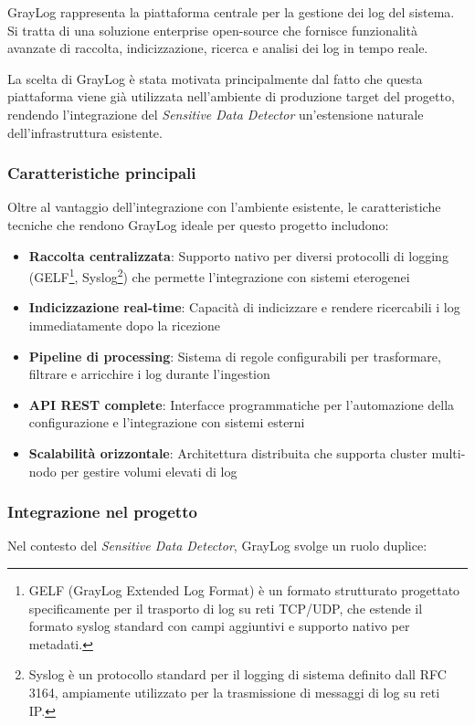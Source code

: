 \documentclass[12pt]{report}
\begin{document}
GrayLog rappresenta la piattaforma centrale per la gestione dei log del sistema. Si tratta di una soluzione enterprise open-source che fornisce funzionalità avanzate di raccolta, indicizzazione, ricerca e analisi dei log in tempo reale.

La scelta di GrayLog è stata motivata principalmente dal fatto che questa piattaforma viene già utilizzata nell'ambiente di produzione target del progetto, rendendo l'integrazione del \textit{Sensitive Data Detector} un'estensione naturale dell'infrastruttura esistente.

\subsubsection{Caratteristiche principali}
Oltre al vantaggio dell'integrazione con l'ambiente esistente, le caratteristiche tecniche che rendono GrayLog ideale per questo progetto includono:

\begin{itemize}
    \item \textbf{Raccolta centralizzata}: Supporto nativo per diversi protocolli di logging (GELF\footnote{GELF (GrayLog Extended Log Format) è un formato strutturato progettato specificamente per il trasporto di log su reti TCP/UDP, che estende il formato syslog standard con campi aggiuntivi e supporto nativo per metadati.}, Syslog\footnote{Syslog è un protocollo standard per il logging di sistema definito dall RFC 3164, ampiamente utilizzato per la trasmissione di messaggi di log su reti IP.}) che permette l'integrazione con sistemi eterogenei
    \item \textbf{Indicizzazione real-time}: Capacità di indicizzare e rendere ricercabili i log immediatamente dopo la ricezione
    \item \textbf{Pipeline di processing}: Sistema di regole configurabili per trasformare, filtrare e arricchire i log durante l'ingestion
    \item \textbf{API REST complete}: Interfacce programmatiche per l'automazione della configurazione e l'integrazione con sistemi esterni
    \item \textbf{Scalabilità orizzontale}: Architettura distribuita che supporta cluster multi-nodo per gestire volumi elevati di log
\end{itemize}

\subsubsection{Integrazione nel progetto}
Nel contesto del \textit{Sensitive Data Detector}, GrayLog svolge un ruolo duplice:
\end{document}
